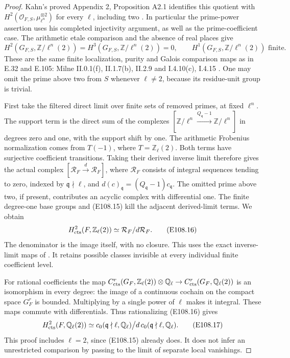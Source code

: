 \begin{proof}
Kahn's proved Appendix 2, Proposition A2.1 identifies this
quotient with $H^2(\mathcal O_{F,S},\mu_{\ell^n}^{\otimes2})$
for every $\ell$, including two
\cite[pp.97--98, Proposition A2.1]{E108_Kahn1993}.
In particular the prime-power assertion uses his completed
injectivity argument, as well as the prime-coefficient case.
The arithmetic etale comparison and the absence of real
places give
\[
 H^2(G_{F,S},\mathbb Z/\ell^n(2))
   =H^3(G_{F,S},\mathbb Z/\ell^n(2))=0,
 \qquad H^1(G_{F,S},\mathbb Z/\ell^n(2))\text{ finite}.
 \tag{E108.15}
\]
These are the same finite localization, purity and Galois
comparison maps as in E.32 and E.105: Milne II.0.1(f),
II.1.7(b), II.2.9 and I.4.10(c), I.4.15
\cite{E_MilneADT}.
One may omit the prime above two from $S$ whenever
$\ell\ne2$, because its residue-unit group is trivial.

First take the filtered direct limit over finite sets of
removed primes, at fixed $\ell^n$.  The support term is
the direct sum of the complexes
$[\mathbb Z/\ell^n\xrightarrow{Q_{\mathfrak q}-1}
\mathbb Z/\ell^n]$ in degrees zero and one, with the
support shift by one.  The arithmetic Frobenius normalization
comes from $T(-1)$, where $T=\mathbb Z_\ell(2)$.
Both terms have surjective coefficient transitions.
Taking their derived inverse limit therefore gives the
actual complex $[\mathcal R_F\xrightarrow d\mathcal R_F]$,
where $\mathcal R_F$ consists of integral sequences tending
to zero, indexed by $\mathfrak q\nmid\ell$, and
$d(c)_{\mathfrak q}=(Q_{\mathfrak q}-1)c_{\mathfrak q}$.
The omitted prime above two, if present, contributes an
acyclic complex with differential one.
The finite degree-one base groups and (E108.15) kill the
adjacent derived-limit terms.  We obtain
\[
 H^2_{\rm cts}(F,\mathbb Z_\ell(2))
          \simeq\mathcal R_F/d\mathcal R_F.
 \tag{E108.16}
\]
The denominator is the image itself, with no closure.
This uses the exact inverse-limit maps of
\cite[Proposition 1.6 and Theorem 2.2]{E_JannsenContinuous}.
It retains possible classes invisible at every individual
finite coefficient level.

For rational coefficients the map
$C^r_{\rm cts}(G_F,\mathbb Z_\ell(2))\otimes\mathbb Q_\ell
\to C^r_{\rm cts}(G_F,\mathbb Q_\ell(2))$ is an isomorphism
in every degree: the image of a continuous cochain on the
compact space $G_F^r$ is bounded.  Multiplying by a single
power of $\ell$ makes it integral.  These maps commute with
differentials.  Thus rationalizing (E108.16) gives
\[
 H^2_{\rm cts}(F,\mathbb Q_\ell(2))
       \simeq c_0(\mathfrak q\nmid\ell,\mathbb Q_\ell)\big/
                d\,c_0(\mathfrak q\nmid\ell,\mathbb Q_\ell).
 \tag{E108.17}
\]
This proof includes $\ell=2$, since (E108.15) already
does.  It does not infer an unrestricted comparison by
passing to the limit of separate local vanishings.


\end{proof}
